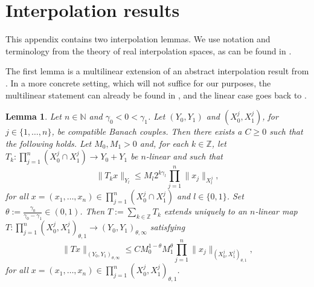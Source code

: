 \documentclass{amsart}
\numberwithin{equation}{section}
\newtheorem{lemma}[theorem]{Lemma}
\theoremstyle{definition}
\newcommand{\N}{\mathbb{N}}
\newcommand{\Z}{\mathbb{Z}}
\begin{document}
\section{Interpolation results}\label{sec:inter}

This appendix contains two interpolation lemmas. We use notation and terminology from the theory of real interpolation spaces, as can be found in \cite{Bergh-Lofstrom76}. 

The first lemma is a multilinear extension of an abstract interpolation result from \cite[Section 6.2]{CaSeWaWr99}. In a more concrete setting, which will not suffice for our purposes, the multilinear statement can already be found in \cite[Lemma 2.6]{Lee03}, and the linear case goes back to \cite{Bourgain85}. 

\begin{lemma}\label{lem:interabstract}
Let $n\in\N$ and $\gamma_{0}<0<\gamma_{1}$. Let %
$(Y_{0},Y_{1})$ and %
$(X^{j}_{0},X^{j}_{1})$, for $j\in\{1,\ldots, n\}$, be compatible Banach couples. %
Then there exists a $C\geq0$ such that the following holds.  Let $M_{0},M_{1}>0$ and, for each $k\in \Z$, let $T_{k}:\prod_{j=1}^{n}(X_{0}^{j}\cap X_{1}^{j})\to Y_{0}+Y_{1}$ be $n$-linear and such that 
\begin{equation}\label{eq:interassump}
\|T_{k}x\|_{Y_{l}}\leq M_{l}2^{k\gamma_{l}}\prod_{j=1}^{n}\|x_{j}\|_{X_{l}^{j}},
\end{equation}
for all $x=(x_{1},\ldots,x_{n})\in \prod_{j=1}^{n}(X_{0}^{j}\cap X_{1}^{j})$ and $l\in\{0,1\}$. Set $\theta:=\frac{\gamma_{0}}{\gamma_{0}-\gamma_{1}}\in(0,1)$. Then $T:=\sum_{k\in\Z}T_{k}$ extends uniquely to an $n$-linear map $T:\prod_{j=1}^{n}(X_{0}^{j},X_{1}^{j})_{\theta,1}\to (Y_{0},Y_{1})_{\theta,\infty}$ satisfying
\begin{equation}\label{eq:interconc}
\|Tx\|_{(Y_{0},Y_{1})_{\theta,\infty}}\leq CM_{0}^{1-\theta}M_{1}^{\theta}\prod_{j=1}^{n}\|x_{j}\|_{(X_{0}^{j},X_{1}^{j})_{\theta,1}},
\end{equation}
for all $x=(x_{1},\ldots,x_{n})\in \prod_{j=1}^{n}(X_{0}^{j},X_{1}^{j})_{\theta,1}$.
\end{lemma}
\end{document}
